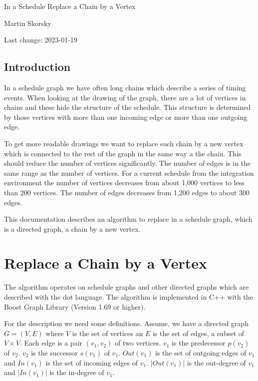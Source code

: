 \documentclass[12pt,a4paper]{report}
\begin{document}
\begin{titlepage}
\vspace{2cm}
\begin{center}
\Huge{In a Schedule Replace a Chain by a Vertex}

\Large{Martin Skorsky}

\Large{Last change: 2023-01-19}
\end{center}
\vfill
\end{titlepage}

\tableofcontents

\section*{Introduction}
In a schedule graph we have often long chains which describe a series of timing events. 
When looking at the drawing of the graph, there are a lot of vertices in chains and 
these hide the structure of the schedule. This structure is determined by those
vertices with more than one incoming edge or more than one outgoing edge.

To get more readable drawings we want to replace each chain by a new vertex which is 
connected to the rest of the graph in the same way a the chain. This should reduce 
the number of vertices significantly. The number of edges is in the same range as 
the number of vertices. For a current schedule from the integration environment 
the number of vertices decreases from about 1,000 vertices to less than 200 vertices.
The number of edges decreases from 1,200 edges to about 300 edges.

This documentation describes an algorithm to replace in a schedule graph, which is a 
directed graph, a chain by a new vertex.

\chapter{Replace a Chain by a Vertex}
The algorithm operates on schedule graphs and other directed graphs which are described 
with the dot language.
The algorithm is implemented in C++ with the Boost Graph Library (Version 1.69 or higher).

For the description we need some definitions. Assume, we have a directed graph $G = (V,E)$ where 
$V$ is the set of vertices an $E$ is the set of edges, a subset of $V \times V$. Each 
edge is a pair $(v_1, v_2)$ of two vertices. $v_1$ is the predecessor $p(v_2)$ of $v_2$. $v_2$ is
the successor $s(v_1)$ of $v_1$. $Out(v_1)$ is the set of outgoing edges of $v_1$ and $In(v_1)$ 
is the set of incoming edges of $v_1$. $|Out(v_1)|$ is the out-degree of $v_1$ and $|In(v_1)|$
is the in-degree of $v_1$.
\end{document}
